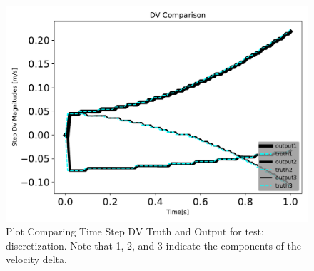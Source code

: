 \begin{figure}[htbp]\centerline{\includegraphics[height=0.7\textwidth, keepaspectratio]{AutoTeX/discretizationDVcomparison}}\caption{Plot Comparing Time Step DV Truth and Output for test: discretization. Note that 1, 2, and 3 indicate the components of the velocity delta.}\label{fig:discretizationDVcomparison}\end{figure}